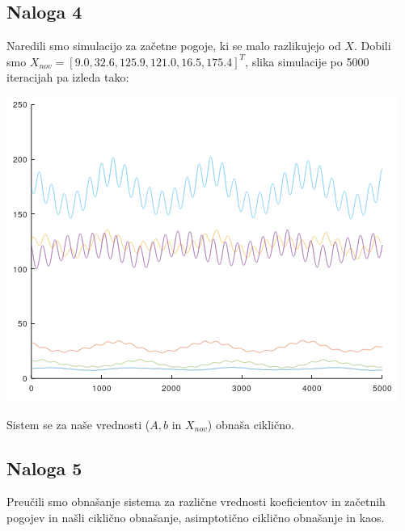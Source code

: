 \documentclass[a4paper, 12pt]{article}
\begin{document}
\subsection{Naloga 4}
Naredili smo simulacijo za začetne pogoje, ki se malo razlikujejo od $ X $. Dobili smo
$ X_{nov} = \left[9.0, 32.6, 125.9, 121.0, 16.5, 175.4\right]^{T} $, slika simulacije po 5000 iteracijah
pa izleda tako:\\
\begin{center}
	\includegraphics{stationary_almost.png}
\end{center}
Sistem se za naše vrednosti ($ A, b $ in $ X_{nov} $) obnaša ciklično.

\subsection{Naloga 5}
Preučili smo obnašanje sistema za različne vrednosti koeficientov in začetnih pogojev
in našli ciklično obnašanje, asimptotično ciklično obnašanje in kaos.\\
\end{document}
